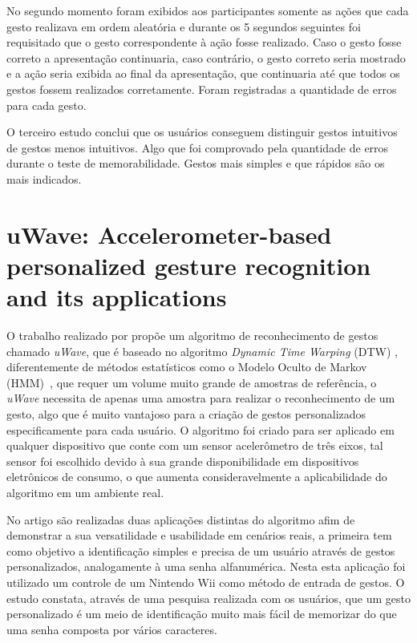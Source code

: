 No segundo momento foram exibidos aos participantes somente as ações que cada gesto realizava em ordem aleatória e durante os 5 segundos seguintes foi requisitado que o gesto correspondente à ação fosse realizado. Caso o gesto fosse correto a apresentação continuaria, caso contrário, o gesto correto seria mostrado e a ação seria exibida ao final da apresentação, que continuaria até que todos os gestos fossem realizados corretamente. Foram registradas a quantidade de erros para cada gesto.

O terceiro estudo conclui que os usuários conseguem distinguir gestos intuitivos de gestos menos intuitivos. Algo que foi comprovado pela quantidade de erros durante o teste de memorabilidade. Gestos mais simples e que rápidos são os mais indicados.

    



\section{uWave: Accelerometer-based personalized gesture recognition and its applications}

\label{cor:uwave}

O trabalho realizado por  propõe um algoritmo de reconhecimento de gestos chamado \textit{uWave}, que é baseado no algoritmo \textit{Dynamic Time Warping} (DTW) \cite{Salvador:2007}, diferentemente de métodos estatísticos como o Modelo Oculto de Markov (HMM)~\cite{hmm:1989}, que requer um volume muito grande de amostras de referência, o \textit{uWave} necessita de apenas uma amostra para realizar o reconhecimento de um gesto, algo que é muito vantajoso para a criação de gestos personalizados especificamente para cada usuário. O algoritmo foi criado para ser aplicado em qualquer dispositivo que conte com um sensor acelerômetro de três eixos, tal sensor foi escolhido devido à sua grande disponibilidade em dispositivos eletrônicos de consumo, o que aumenta consideravelmente a aplicabilidade do algoritmo em um ambiente real.

No artigo são realizadas duas aplicações distintas do algoritmo afim de demonstrar a sua versatilidade e usabilidade em cenários reais, a primeira tem como objetivo a identificação simples e precisa de um usuário através de gestos personalizados, analogamente à uma senha alfanumérica. Nesta esta aplicação foi utilizado um controle de um Nintendo Wii  como método de entrada de gestos. O estudo constata, através de uma pesquisa realizada com os usuários, que um gesto personalizado é um meio de identificação muito mais fácil de memorizar do que uma senha composta por vários caracteres. 

